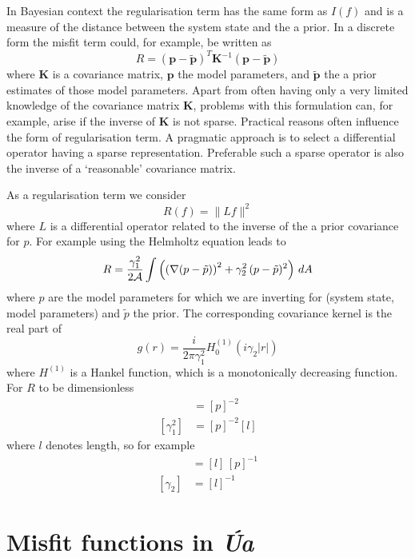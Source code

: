 \documentclass[10pt,a4paper]{book}
\newcommand{\Ua}{\textsl{\'Ua}\,}
\begin{document}
In Bayesian context the regularisation term has the same form as
$I(f)$ and is a measure of the distance between the system state and
the a prior. In a discrete form the misfit term could, for example, be
written as
\[
R=(\bm{p}-\tilde{\bm{p}})^T \bm{K}^{-1}  (\bm{p}-\tilde{\bm{p}}) 
\]
where $\bm{K}$ is a covariance matrix, $\bm{p}$ the model parameters,
and $\tilde{\bm{p}}$ the a prior estimates of those model
parameters. Apart from often having only a very limited knowledge of
the covariance matrix $\bm{K}$, problems with this formulation can,
for example, arise if the inverse of $\bm{K}$ is not sparse. Practical
reasons often influence the form of regularisation term. A pragmatic
approach is to select a differential operator having a sparse
representation. Preferable such a sparse operator is also the inverse
of a `reasonable' covariance matrix.

As a regularisation term we consider
\[
 R(f)=\| L f \|^2
\]
where $L$ is a differential operator related to the inverse of the
a prior covariance for $p$. For example using the Helmholtz equation leads to
\begin{equation}
R=  \frac{\gamma_1^2}{2\cal{A}} \int \left (  \left ( \nabla( p - \tilde{p}) \right )^2 + \gamma_2^2 \, (p-\tilde{p})^2 \right ) \, dA
\label{eq:HR}
\end{equation}
where $p$ are the model parameters  for which we are inverting for (system state, model
parameters) and $\tilde{p}$ the prior. The corresponding covariance kernel is
the real part of
\begin{equation}
g(r)= \frac{i}{2 \pi \gamma_1^2} H^{(1)}_0 (i \gamma_2 |r|)
\label{eq:HR2}
\end{equation}
where $H^{(1)}$ is a Hankel function, which is a monotonically
decreasing function. For $R$ to be dimensionless
\begin{align*}
[\gamma_1^2 \gamma_2^2] &= [p]^{-2} \\
[\gamma_1^2]&= [p]^{-2} [l]
\end{align*}
where $l$ denotes length, so for example
\begin{align*}
[\gamma_1]&=[l] \, [p]^{-1} \\
[\gamma_2]&=[l]^{-1} 
\end{align*}




\section{Misfit functions in \Ua}
\end{document}
